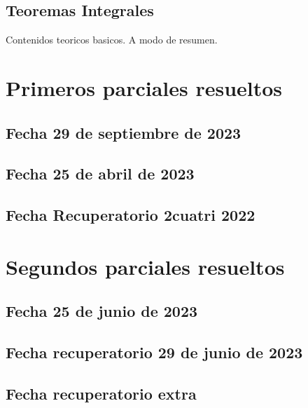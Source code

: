 \documentclass[10pt, a4paper]{report}
\theoremstyle{definition} %
\begin{document}
        \section{Teoremas Integrales}

        Contenidos teoricos basicos. A modo de resumen. 

    \chapter{Primeros parciales resueltos}
        \section{Fecha 29 de septiembre de 2023}
            

        \newpage
        \section{Fecha 25 de abril de 2023}
            

        \newpage
        \section{Fecha Recuperatorio 2cuatri 2022}
            


        \newpage
    \chapter{Segundos parciales resueltos}
        \section{Fecha 25 de junio de 2023}
            

        \newpage
        \section{Fecha recuperatorio 29 de junio de 2023}
            

        \newpage
        \section{Fecha recuperatorio extra}
            
    
\end{document}
